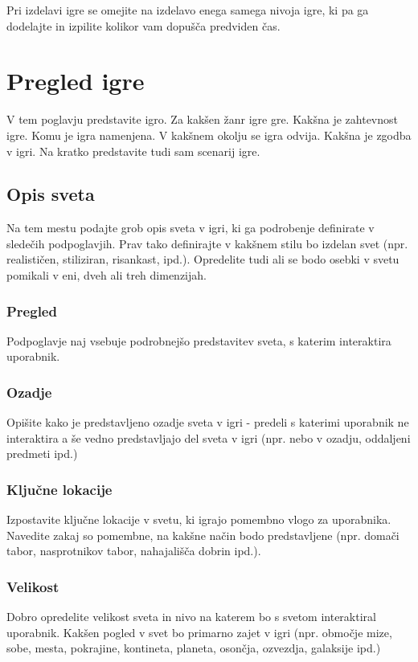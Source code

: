 \documentclass[a4paper]{article}
\begin{document}
Pri izdelavi igre se omejite na izdelavo enega samega nivoja igre, ki pa ga dodelajte in izpilite kolikor vam do\-pu\-šča predviden čas.




\section{Pregled igre}
V tem poglavju predstavite igro. Za kakšen žanr igre gre. Kakšna je zahtevnost igre. Komu je igra namenjena. V kakšnem okolju se igra odvija. Kakšna je zgodba v igri. Na kratko predstavite tudi sam scenarij igre.

\subsection{Opis sveta}
Na tem mestu podajte grob opis sveta v igri, ki ga podrobenje definirate v sledečih podpoglavjih. Prav tako definirajte v kakšnem stilu bo izdelan svet (npr. realističen, stiliziran, risankast, ipd.). Opredelite tudi ali se bodo osebki v svetu pomikali v eni, dveh ali treh dimenzijah.

\subsubsection{Pregled}
Podpoglavje naj vsebuje podrobnejšo predstavitev sveta, s katerim interaktira uporabnik.

\subsubsection{Ozadje}
Opišite kako je predstavljeno ozadje sveta v igri - predeli s katerimi uporabnik ne interaktira a še vedno predstavljajo del sveta v igri (npr. nebo v ozadju, oddaljeni predmeti ipd.)

\subsubsection{Ključne lokacije}
Izpostavite ključne lokacije v svetu, ki igrajo pomembno vlogo za uporabnika. Navedite zakaj so pomembne, na kakšne način bodo predstavljene (npr. domači tabor, nasprotnikov tabor, nahajališča dobrin  ipd.).

\subsubsection{Velikost}
Dobro opredelite velikost sveta in nivo na katerem bo s svetom interaktiral uporabnik. Kakšen pogled v svet bo primarno zajet v igri (npr. območje mize, sobe, mesta, pokrajine, kontineta, planeta, osončja, ozvezdja, galaksije ipd.)
\end{document}

